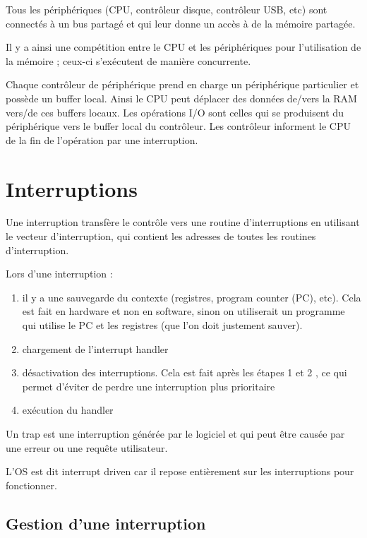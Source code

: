 	Tous les périphériques (CPU, contrôleur disque, contrôleur USB, etc) sont connectés à un bus partagé et qui leur donne un accès à de la mémoire partagée.
	
	Il y a ainsi une compétition entre le CPU et les périphériques pour l'utilisation de la mémoire ; ceux-ci s'exécutent de manière concurrente.
	
	Chaque contrôleur de périphérique prend en charge un périphérique particulier et possède un buffer local. Ainsi le CPU peut déplacer des données de/vers la RAM vers/de ces buffers locaux. Les opérations I/O sont celles qui se produisent du périphérique vers le buffer local du contrôleur. Les contrôleur informent le CPU de la fin de l'opération par une interruption.
	
	\section{Interruptions}
	
	Une interruption transfère le contrôle vers une routine d'interruptions en utilisant le vecteur d'interruption, qui contient les adresses de toutes les routines d'interruption.
	
	Lors d'une interruption :
	
	\begin{enumerate}
		\item il y a une sauvegarde du contexte (registres, program counter (PC), etc). Cela est fait en hardware et non en software, sinon on utiliserait un programme qui utilise le PC et les registres (que l'on doit justement sauver).
		\item chargement de l'interrupt handler
		\item désactivation des interruptions. Cela est fait après les étapes 1 et 2 , ce qui permet d'éviter de perdre une interruption plus prioritaire
		\item exécution du handler
	\end{enumerate}
	
	Un trap est une interruption générée par le logiciel et qui peut être causée par une erreur ou une requête utilisateur.
	
	L'OS est dit interrupt driven car il repose entièrement sur les interruptions pour fonctionner.
	
		\subsection{Gestion d'une interruption}
		
